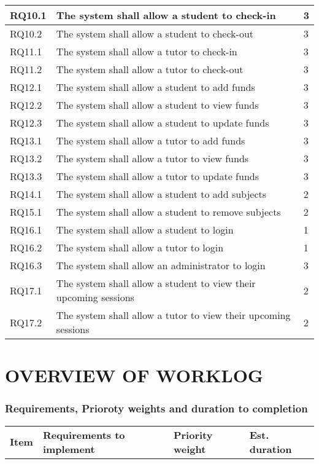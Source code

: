 \documentclass[12pt]{article}
\begin{document}
{\begin{longtable}{| l | p{10cm}| l |}
				RQ10.1 & The system shall allow a student to check-in  & 3\\ \hline	
				RQ10.2 & The system shall allow a student to check-out  & 3\\ \hline
				RQ11.1 & The system shall allow a tutor to check-in  & 3\\ 
\hline	
				RQ11.2 & The system shall allow a tutor to check-out  & 3\\ \hline
				RQ12.1 & The system shall allow a student to add funds & 3\\ \hline
				RQ12.2 & The system shall allow a student to view funds & 3\\ \hline
				RQ12.3 & The system shall allow a student to update funds & 3\\ \hline
				RQ13.1 & The system shall allow a tutor to add funds & 3\\ \hline
				RQ13.2 & The system shall allow a tutor to view funds & 3\\ \hline
				RQ13.3 & The system shall allow a tutor to update funds & 3\\ \hline
				RQ14.1 & The system shall allow a student to add subjects & 2\\ \hline
				RQ15.1 & The system shall allow a student to remove subjects & 2\\ \hline
				RQ16.1 & The system shall allow a student to login & 1\\ \hline
				RQ16.2 & The system shall allow a tutor to login & 1\\ \hline
				RQ16.3 & The system shall allow an administrator to login & 3\\ \hline
				RQ17.1 & The system shall allow a student to view their upcoming sessions  & 2\\ \hline
				RQ17.2 & The system shall allow a tutor to view their upcoming sessions  & 2\\ \hline
			
\end{longtable}



\section{OVERVIEW OF WORKLOG }
\subsubsection{Requirements, Prioroty weights and duration to completion}
{
\centering
\begin{longtable}{| p{1.5cm} | p{8cm}| p{2cm}| p{3cm} |}
\hline			
			\textbf{Item} & \textbf{Requirements to implement} & \textbf{Priority weight}	& \textbf{Est. duration}	
			

\end{longtable}}}
\end{document}
